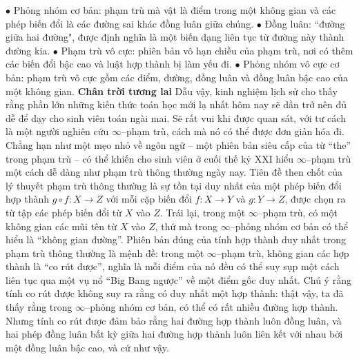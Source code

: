 \begin{multicols}{2}
	\vskip 0.1cm
	$\bullet$ Phỏng nhóm cơ bản: phạm trù mà vật là điểm trong một không gian và các phép biến đổi là các đường sai khác đồng luân \linebreak giữa chúng.
	\vskip 0.1cm		
	$\bullet$ Đồng luân: ``đường giữa hai đường", được định nghĩa là một biến dạng liên tục từ đường này thành đường kia.
	\vskip 0.1cm		
	$\bullet$ Phạm trù vô cực: phiên bản vô hạn chiều của phạm trù, nơi có thêm các biến đổi bậc cao và luật hợp thành bị làm yếu đi.
	\vskip 0.1cm	
	$\bullet$ Phỏng nhóm vô cực cơ bản: phạm trù vô cực gồm các điểm, đường, đồng luân và đồng luân bậc cao của một không gian.
	\vskip 0.1cm
	\textbf{\color{duongvaotoanhoc}Chân trời tương lai}
	\vskip 0.1cm
	Dẫu vậy, kinh nghiệm lịch sử cho thấy rằng phần lớn những kiến thức toán học mới lạ nhất hôm nay sẽ dần trở nên đủ dễ để dạy cho sinh viên toán ngài mai. Sẽ rất vui khi được quan sát, với tư cách là một người nghiên cứu $\infty$--phạm trù, cách mà nó có thể được đơn giản hóa đi. Chẳng hạn như một mẹo nhỏ về ngôn ngữ -- một phiên bản siêu cấp của từ ``the'' trong phạm trù -- có thể khiến cho sinh viên ở cuối thế kỷ XXI hiểu $\infty$--phạm trù một cách dễ dàng như phạm trù thông thường ngày nay. Tiên đề then chốt của lý thuyết phạm trù thông thường là sự tồn tại duy nhất của một phép biến đổi hợp thành $g \circ f: X \to Z$ với mỗi cặp biến đổi $f: X \to Y$ và $g: Y \to Z$, được chọn ra từ tập các phép biến đổi từ $X$ vào $Z$. Trái lại, trong một $\infty$--phạm trù, có một không gian các mũi tên từ $X$ vào $Z$, thứ mà trong $\infty$--phỏng nhóm cơ bản có thể hiểu là ``không gian đường''. Phiên bản đúng của tính hợp thành duy nhất trong phạm trù thông thường là mệnh đề: trong một $\infty$--phạm trù, không gian các hợp thành là ``co rút được'', nghĩa là mỗi điểm của nó đều có thể suy sụp một cách liên tục qua một vụ nổ ``Big Bang ngược'' về một điểm gốc duy nhất.
	\vskip 0.1cm
	Chú ý rằng tính co rút được không suy ra rằng có duy nhất một hợp thành: thật vậy, ta đã thấy rằng trong $\infty$--phỏng nhóm cơ bản, có thể có rất nhiều đường hợp thành. Nhưng tính co rút được đảm bảo rằng hai đường hợp thành luôn đồng luân, và hai phép đồng luân bất kỳ giữa hai đường hợp thành luôn liên kết với nhau bởi một đồng luân bậc cao, và cứ như vậy.
	\begin{figure}[H]
		\centering
		\vspace*{-5pt}
		\captionsetup{labelformat= empty, justification=centering}

\end{figure}
\end{multicols}
